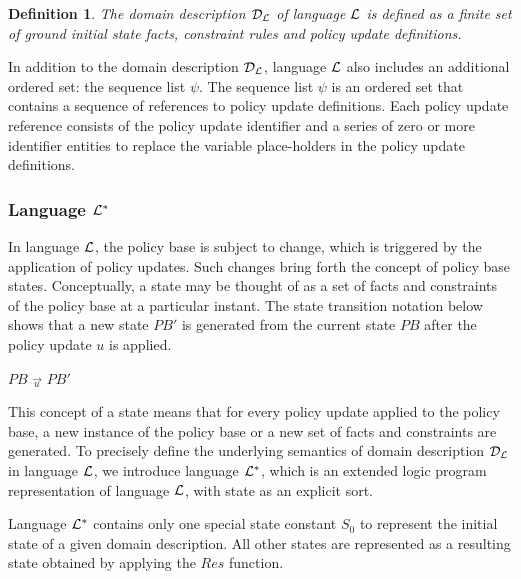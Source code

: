 \documentclass[11pt, twocolumn]{article}
\newtheorem{vdefinition}{Definition}
\newenvironment{vquote}
  {\begin{list}{}{\leftmargin 1em}\item[]}
  {\end{list}}
\begin{document}
        \begin{vdefinition}
          \label{def-domain}
          The domain description ${\cal D}_{\cal L}$ of language ${\cal L}$ is
          defined as a finite set of ground initial state facts, constraint
          rules and policy update definitions.
        \end{vdefinition}

        In addition to the domain description ${\cal D}_{\cal L}$, language
        ${\cal L}$ also includes an additional ordered set: the sequence list
        $\psi$. The sequence list $\psi$ is an ordered set that contains a
        sequence of references to policy update definitions. Each policy update
        reference consists of the policy update identifier and a series of zero
        or more identifier entities to replace the variable place-holders in
        the policy update definitions.

      \subsubsection{Language ${\cal L}^{*}$}

        In language ${\cal L}$, the policy base is subject to change, which is
        triggered by the application of policy updates. Such changes bring
        forth the concept of policy base states. Conceptually, a state may be
        thought of as a set of facts and constraints of the policy base at a
        particular instant. The state transition notation below shows that a
        new state $PB'$ is generated from the current state $PB$ after the
        policy update $u$ is applied.

        \begin{vquote}
          $PB$ $\overrightarrow{_{u}}$ $PB'$
        \end{vquote}

        This concept of a state means that for every policy update applied
        to the policy base, a new instance of the policy base or a new set of
        facts and constraints are generated. To precisely define the underlying
        semantics of domain description ${\cal D}_{\cal L}$ in language
        ${\cal L}$, we introduce language ${\cal L}^{*}$, which is an extended
        logic program representation of language ${\cal L}$, with state as an
        explicit sort.

        Language ${\cal L}^{*}$ contains only one special state constant
        $S_{0}$ to represent the initial state of a given domain description.
        All other states are represented as a resulting state obtained by
        applying the $Res$ function.
\end{document}
